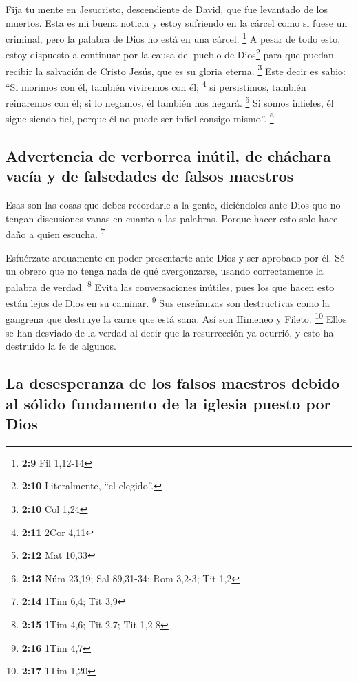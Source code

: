  Fija tu mente en Jesucristo, descendiente de David, que
fue levantado de los muertos. Esta es mi buena noticia  y
estoy sufriendo en la cárcel como si fuese un criminal, pero la palabra
de Dios no está en una cárcel. \footnote{\textbf{2:9} Fil 1,12-14}
 A pesar de todo esto, estoy dispuesto a continuar por la
causa del pueblo de Dios\footnote{\textbf{2:10} Literalmente, ``el
  elegido''.} para que puedan recibir la salvación de Cristo Jesús, que
es su gloria eterna. \footnote{\textbf{2:10} Col 1,24} 
Este decir es sabio: ``Si morimos con él, también viviremos con él;
\footnote{\textbf{2:11} 2Cor 4,11}  si persistimos,
también reinaremos con él; si lo negamos, él también nos negará.
\footnote{\textbf{2:12} Mat 10,33}  Si somos infieles, él
sigue siendo fiel, porque él no puede ser infiel consigo mismo''.
\footnote{\textbf{2:13} Núm 23,19; Sal 89,31-34; Rom 3,2-3; Tit 1,2}

\hypertarget{advertencia-de-verborrea-inuxfatil-de-chuxe1chara-vacuxeda-y-de-falsedades-de-falsos-maestros}{%
\subsection{Advertencia de verborrea inútil, de cháchara vacía y de
falsedades de falsos
maestros}\label{advertencia-de-verborrea-inuxfatil-de-chuxe1chara-vacuxeda-y-de-falsedades-de-falsos-maestros}}

 Esas son las cosas que debes recordarle a la gente,
diciéndoles ante Dios que no tengan discusiones vanas en cuanto a las
palabras. Porque hacer esto solo hace daño a quien escucha. \footnote{\textbf{2:14}
  1Tim 6,4; Tit 3,9}

 Esfuérzate arduamente en poder presentarte ante Dios y
ser aprobado por él. Sé un obrero que no tenga nada de qué avergonzarse,
usando correctamente la palabra de verdad. \footnote{\textbf{2:15} 1Tim
  4,6; Tit 2,7; Tit 1,2-8}  Evita las conversaciones
inútiles, pues los que hacen esto están lejos de Dios en su caminar.
\footnote{\textbf{2:16} 1Tim 4,7}  Sus enseñanzas son
destructivas como la gangrena que destruye la carne que está sana. Así
son Himeneo y Fileto. \footnote{\textbf{2:17} 1Tim 1,20} 
Ellos se han desviado de la verdad al decir que la resurrección ya
ocurrió, y esto ha destruido la fe de algunos.

\hypertarget{la-desesperanza-de-los-falsos-maestros-debido-al-suxf3lido-fundamento-de-la-iglesia-puesto-por-dios}{%
\subsection{La desesperanza de los falsos maestros debido al sólido
fundamento de la iglesia puesto por
Dios}\label{la-desesperanza-de-los-falsos-maestros-debido-al-suxf3lido-fundamento-de-la-iglesia-puesto-por-dios}}


